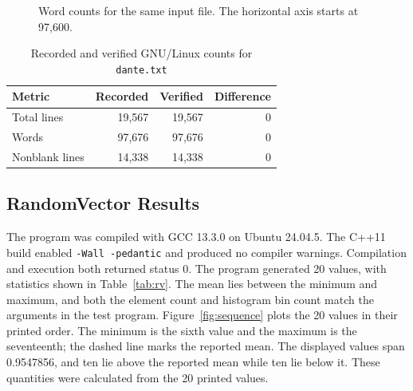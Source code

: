 \documentclass[letterpaper,10pt,conference]{ieeeconf}
\begin{document}
\begin{figure}[t]
\centering
{}
\caption{Word counts for the same input file. The horizontal axis starts at 97,600.}
\label{fig:word-compare}
\end{figure}

\begin{table}[t]
\caption{Recorded and verified GNU/Linux counts for \texttt{dante.txt}}
\label{tab:shell}
\centering
\footnotesize
\begin{tabular}{lrrr}
\toprule
Metric & Recorded & Verified & Difference \\
\midrule
Total lines & 19,567 & 19,567 & 0 \\
Words & 97,676 & 97,676 & 0 \\
Nonblank lines & 14,338 & 14,338 & 0 \\
\bottomrule
\end{tabular}
\end{table}

\subsection{RandomVector Results}

The program was compiled with GCC 13.3.0 on Ubuntu 24.04.5. The C++11 build enabled \texttt{-Wall -pedantic} and produced no compiler warnings. Compilation and execution both returned status 0. The program generated 20 values, with statistics shown in Table~\ref{tab:rv}. The mean lies between the minimum and maximum, and both the element count and histogram bin count match the arguments in the test program. Figure~\ref{fig:sequence} plots the 20 values in their printed order. The minimum is the sixth value and the maximum is the seventeenth; the dashed line marks the reported mean. The displayed values span 0.9547856, and ten lie above the reported mean while ten lie below it. These quantities were calculated from the 20 printed values.
\end{document}
